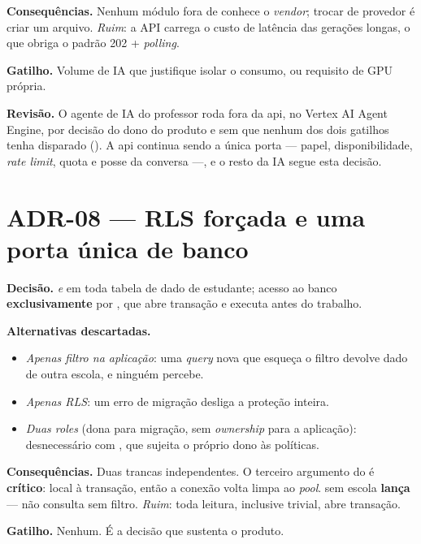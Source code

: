 \textbf{Consequências.} Nenhum módulo fora de  conhece o
\emph{vendor}; trocar de provedor é criar um arquivo. \emph{Ruim}: a API carrega o
custo de latência das gerações longas, o que obriga o padrão 202 +
\emph{polling}.

\textbf{Gatilho.} Volume de IA que justifique isolar o consumo, ou requisito de
GPU própria.

\textbf{Revisão.} O agente de IA do professor roda fora da api, no Vertex AI
Agent Engine, por decisão do dono do produto e sem que nenhum dos dois gatilhos
tenha disparado (). A api continua sendo a única porta --- papel,
disponibilidade, \emph{rate limit}, quota e posse da conversa ---, e o resto da IA
segue esta decisão.

\section{ADR-08 --- RLS forçada e uma porta única de banco}

\textbf{Decisão.}  \emph{e}  em toda
tabela de dado de estudante; acesso ao banco \textbf{exclusivamente} por
, que abre transação e executa
 antes do trabalho.

\textbf{Alternativas descartadas.}
\begin{itemize}
  \item \emph{Apenas filtro na aplicação}: uma \emph{query} nova que esqueça o
    filtro devolve dado de outra escola, e ninguém percebe.
  \item \emph{Apenas RLS}: um erro de migração desliga a proteção inteira.
  \item \emph{Duas \emph{roles}} (dona para migração, sem \emph{ownership} para a
    aplicação): desnecessário com , que sujeita o próprio dono às
    políticas.
\end{itemize}

\textbf{Consequências.} Duas trancas independentes. O terceiro argumento
 do  é \textbf{crítico}: local à transação, então a
conexão volta limpa ao \emph{pool}.  sem escola \textbf{lança} ---
não consulta sem filtro. \emph{Ruim}: toda leitura, inclusive trivial, abre
transação.

\textbf{Gatilho.} Nenhum. É a decisão que sustenta o produto.

